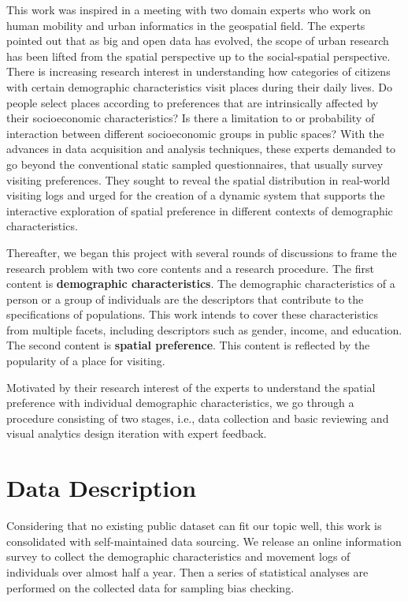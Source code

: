 \documentclass{ieeeaccess}
\begin{document}
\label{sec:concept}
This work was inspired in a meeting with two domain experts who work on human mobility and urban informatics in the geospatial field. The experts pointed out that as big and open data has evolved, the scope of urban research has been lifted from the spatial perspective up to the social-spatial perspective. There is increasing research interest in understanding how categories of citizens with certain demographic characteristics visit places during their daily lives. Do people select places according to preferences that are intrinsically affected by their socioeconomic characteristics? Is there a limitation to or probability of interaction between different socioeconomic groups in public spaces? With the advances in data acquisition and analysis techniques, these experts demanded to go beyond the conventional static sampled questionnaires, that usually survey visiting preferences. They sought to reveal the spatial distribution in real-world visiting logs and urged for the creation of a dynamic system that supports the interactive exploration of spatial preference in different contexts of demographic characteristics.

Thereafter, we began this project with several rounds of discussions to frame the research problem with two core contents and a research procedure. The first content is \textbf{demographic characteristics}. The demographic characteristics of a person or a group of individuals are the descriptors that contribute to the specifications of populations. This work intends to cover these characteristics from multiple facets, including descriptors such as gender, income, and education. The second content is \textbf{spatial preference}. This content is reflected by the popularity of a place for visiting.

Motivated by their research interest of the experts to understand the spatial preference with individual demographic characteristics, we go through a procedure consisting of two stages, i.e., data collection and basic reviewing and visual analytics design iteration with expert feedback.

\section{Data Description}
\label{subsec:pipeline}
Considering that no existing public dataset can fit our topic well, this work is consolidated with self-maintained data sourcing. We release an online information survey to collect the demographic characteristics and movement logs of individuals over almost half a year. Then a series of statistical analyses are performed on the collected data for sampling bias checking.
\end{document}

